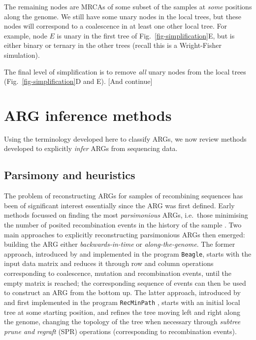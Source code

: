 \documentclass{article}
\begin{document}
The remaining nodes are MRCAs of some subset of the samples
at \emph{some} positions along the genome. We still have
some unary nodes in the local trees, but these nodes will
correspond to a coalescence in at least one other
local tree. For example, node $E$ is unary in the first tree
of Fig.~\ref{fig-simplification}E, but is either binary
or ternary in the other trees (recall this is a Wright-Fisher
simulation).

The final level of simplification is to remove \emph{all}
unary nodes from the local trees (Fig.~\ref{fig-simplification}D
and E). [And continue]




\section*{ARG inference methods}
Using the terminology developed here to classify ARGs, we now review methods developed
to explicitly \emph{infer} ARGs from sequencing data.

\subsection*{Parsimony and heuristics}
The problem of reconstructing ARGs for samples of recombining sequences has been of significant
 interest essentially since the ARG was first defined. Early methods focussed on finding the most
 \emph{parsimonious} ARGs, i.e.\ those minimising the number of posited recombination events in
 the history of the sample \citep{hein1990reconstructing}. Two main approaches to explicitly reconstructing
 parsimonious ARGs then emerged: building the ARG either \emph{backwards-in-time} or \emph{along-the-genome}.
 The former approach, introduced by \citet{lyngso2005minimum} and implemented in the program
 \texttt{Beagle}, starts with the input data matrix and reduces it through row and column operations
 corresponding to coalescence, mutation and recombination events, until the empty matrix is reached;
 the corresponding sequence of events can then be used to construct an ARG from the bottom up. The
 latter approach, introduced by \citet{song2003parsimonious} and first implemented in the program
 \texttt{RecMinPath} \citep{song2005constructing}, starts with an initial local tree at some starting
 position, and refines the tree moving left and right along the genome, changing the topology of the
 tree when necessary through \emph{subtree prune and regraft} (SPR) operations (corresponding to
 recombination events).
\end{document}
